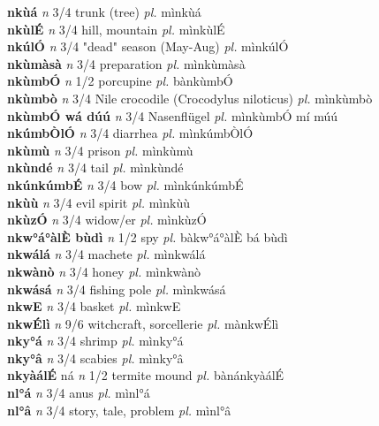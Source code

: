 \documentclass{article}
\newlength\cus
\begin{document}
{\bf nkùá}  {\it n} 3/4 trunk (tree) {\it pl.} mìnkùá         \\ 
{\bf nkùlÉ}  {\it n} 3/4 hill, mountain {\it pl.} mìnkùlÉ         \\ 
{\bf nkúlÓ}  {\it n} 3/4 "dead" season (May-Aug) {\it pl.} mìnkúlÓ         \\ 
{\bf nkùmàsà}  {\it n} 3/4 preparation {\it pl.} mìnkùmàsà         \\ 
{\bf nkùmbÓ}  {\it n} 1/2 porcupine {\it pl.} bànkùmbÓ         \\ 
{\bf nkùmbò}  {\it n} 3/4 Nile crocodile (Crocodylus niloticus) {\it pl.} mìnkùmbò         \\ 
{\bf nkùmbÓ wá dúú}  {\it n} 3/4 Nasenflügel {\it pl.} mìnkùmbÓ mí múú         \\ 
{\bf nkúmbÒlÓ}  {\it n} 3/4 diarrhea {\it pl.} mìnkúmbÒlÓ         \\ 
{\bf nkùmù}  {\it n} 3/4 prison {\it pl.} mìnkùmù         \\ 
{\bf nkùndé}  {\it n} 3/4 tail {\it pl.} mìnkùndé         \\ 
{\bf nkúnkúmbÉ}  {\it n} 3/4 bow {\it pl.} mìnkúnkúmbÉ         \\ 
{\bf nkùù}  {\it n} 3/4 evil spirit {\it pl.} mìnkùù         \\ 
{\bf nkùzÓ}  {\it n} 3/4 widow/er {\it pl.} mìnkùzÓ         \\ 
{\bf nkw°á°àlÈ bùdì}  {\it n} 1/2 spy {\it pl.} bàkw°á°àlÈ bá bùdì         \\ 
{\bf nkwálá}  {\it n} 3/4 machete {\it pl.} mìnkwálá         \\ 
{\bf nkwànò}  {\it n} 3/4 honey {\it pl.} mìnkwànò         \\ 
{\bf nkwásá}  {\it n} 3/4 fishing pole {\it pl.} mìnkwásá         \\ 
{\bf nkwE}  {\it n} 3/4 basket {\it pl.} mìnkwE         \\ 
{\bf nkwÉlì}  {\it n} 9/6 witchcraft, sorcellerie {\it pl.} mànkwÉlì         \\ 
{\bf nky°á}  {\it n} 3/4 shrimp {\it pl.} mìnky°á         \\ 
{\bf nky°â}  {\it n} 3/4 scabies {\it pl.} mìnky°â         \\ 
{\bf nkyàálÉ} ná {\it n} 1/2 termite mound {\it pl.} bànánkyàálÉ         \\ 
{\bf nl°á}  {\it n} 3/4 anus {\it pl.} mìnl°á         \\ 
{\bf nl°â}  {\it n} 3/4 story, tale, problem {\it pl.} mìnl°â         \\ 
\end{document}

